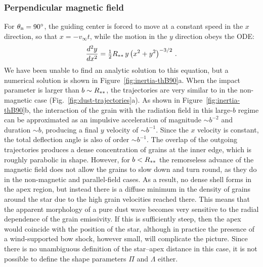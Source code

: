 \subsubsection{Perpendicular magnetic field}
\label{sec:perp-magn-field}

For \(\theta_{\scriptscriptstyle\text{B}} = \ang{90}\), the guiding center is forced to move at a
constant speed in the \(x\) direction, so that \(x = -v_\infty t\), while
the motion in the \(y\) direction obeys the ODE:
\begin{equation}
  \label{eq:ode-perp-bfield}
  \frac{d^2 y}{d x^2} = \tfrac12 R_{**}  \,
  y \, \bigl( x^2 + y^2\bigr)^{-3/2} \ .
\end{equation}
We have been unable to find an analytic solution to this equation, but
a numerical solution is shown in Figure~\ref{fig:inertia-thB90}a.
When the impact parameter is larger than \(b \sim R_{**}\), the
trajectories are very similar to in the non-magnetic case
(Fig.~\ref{fig:dust-trajectories}a).  As shown in
Figure~\ref{fig:inertia-thB90}b, the interaction of the grain with the
radiation field in this large-\(b\) regime can be approximated as an
impulsive acceleration of magnitude \(\sim b^{-2}\) and duration
\(\sim b\), producing a final \(y\) velocity of \(\sim b^{-1}\).  Since the
\(x\) velocity is constant, the total deflection angle is also of
order \(\sim b^{-1}\).  The overlap of the outgoing trajectories produces
a dense concentration of grains at the inner edge, which is roughly
parabolic in shape.  However, for \(b < R_{**}\) the remorseless
advance of the magnetic field does not allow the grains to slow down
and turn round, as they do in the non-magnetic and parallel-field
cases.  As a result, no dense shell forms in the apex region, but
instead there is a diffuse minimum in the density of grains around the
star due to the high grain velocities reached there.  This means that
the apparent morphology of a pure dust wave becomes very sensitive to
the radial dependence of the grain emissivity.  If this is
sufficiently steep, then the apex would coincide with the position of
the star, although in practice the presence of a wind-supported bow
shock, however small, will complicate the picture.  Since there is no
unambiguous definition of the star--apex distance in this case, it is
not possible to define the shape parameters \(\Pi\) and \(\Lambda\) either.



